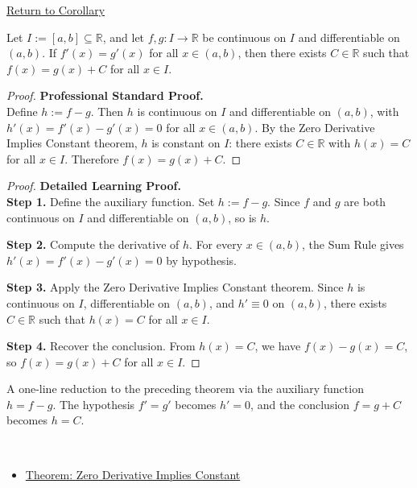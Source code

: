 \newpage
{}
\label{prf:equal-derivatives-constant-difference}

\begin{remark*}[Return]
\hyperref[cor:equal-derivatives-constant-difference]{Return to Corollary}
\end{remark*}

\begin{theorem*}
Let $I := [a,b] \subseteq \mathbb{R}$, and let $f, g : I \to \mathbb{R}$ be continuous on $I$ and differentiable on $(a,b)$. If $f'(x) = g'(x)$ for all $x \in (a,b)$, then there exists $C \in \mathbb{R}$ such that $f(x) = g(x) + C$ for all $x \in I$.
\end{theorem*}

\begin{proof}
\textbf{Professional Standard Proof.}~\\
Define $h := f - g$. Then $h$ is continuous on $I$ and differentiable on $(a,b)$, with $h'(x) = f'(x) - g'(x) = 0$ for all $x \in (a,b)$. By the Zero Derivative Implies Constant theorem, $h$ is constant on $I$: there exists $C \in \mathbb{R}$ with $h(x) = C$ for all $x \in I$. Therefore $f(x) = g(x) + C$.
\end{proof}

\begin{proof}
\textbf{Detailed Learning Proof.}~\\

\textbf{Step 1.} Define the auxiliary function. Set $h := f - g$. Since $f$ and $g$ are both continuous on $I$ and differentiable on $(a,b)$, so is $h$.

\textbf{Step 2.} Compute the derivative of $h$. For every $x \in (a,b)$, the Sum Rule gives $h'(x) = f'(x) - g'(x) = 0$ by hypothesis.

\textbf{Step 3.} Apply the Zero Derivative Implies Constant theorem. Since $h$ is continuous on $I$, differentiable on $(a,b)$, and $h' \equiv 0$ on $(a,b)$, there exists $C \in \mathbb{R}$ such that $h(x) = C$ for all $x \in I$.

\textbf{Step 4.} Recover the conclusion. From $h(x) = C$, we have $f(x) - g(x) = C$, so $f(x) = g(x) + C$ for all $x \in I$.
\end{proof}

\begin{remark*}
A one-line reduction to the preceding theorem via the auxiliary function $h = f - g$. The hypothesis $f' = g'$ becomes $h' = 0$, and the conclusion $f = g + C$ becomes $h = C$.
\end{remark*}

\begin{remark*}[Dependencies]~\\
\begin{itemize}
  \item \hyperref[thm:zero-derivative-implies-constant]{Theorem: Zero Derivative Implies Constant}
\end{itemize}
\end{remark*}
